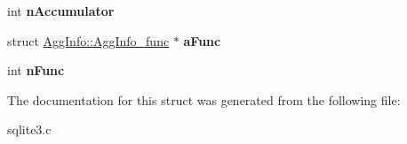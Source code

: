 \begin{DoxyCompactItemize}
\item 
int {\bfseries n\+Accumulator}\hypertarget{structAggInfo_ad2251760d95af9024f0a3170405cb53b}{}\label{structAggInfo_ad2251760d95af9024f0a3170405cb53b}

\item 
struct \hyperlink{structAggInfo_1_1AggInfo__func}{Agg\+Info\+::\+Agg\+Info\+\_\+func} $\ast$ {\bfseries a\+Func}\hypertarget{structAggInfo_a4e201acd6a1f8aed360c58e45f47c803}{}\label{structAggInfo_a4e201acd6a1f8aed360c58e45f47c803}

\item 
int {\bfseries n\+Func}\hypertarget{structAggInfo_a5bfde7ca00d28da6edbda523ab038e38}{}\label{structAggInfo_a5bfde7ca00d28da6edbda523ab038e38}

\end{DoxyCompactItemize}


The documentation for this struct was generated from the following file\+:\begin{DoxyCompactItemize}
\item 
sqlite3.\+c\end{DoxyCompactItemize}
